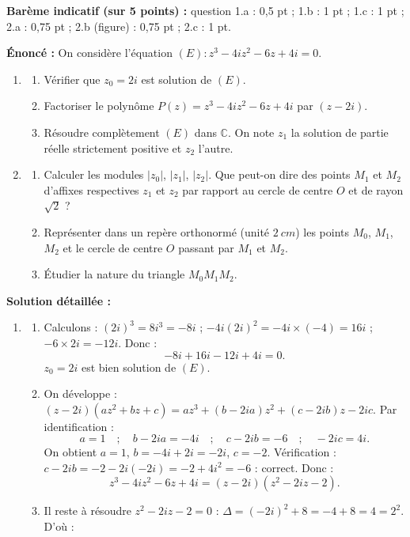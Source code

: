 \documentclass[11pt]{article}
\begin{document}
\begin{corrige}
\textbf{Barème indicatif (sur 5 points) :} question 1.a : 0,5 pt ; 1.b : 1 pt ; 1.c : 1 pt ; 2.a : 0,75 pt ; 2.b (figure) : 0,75 pt ; 2.c : 1 pt.

\textbf{Énoncé :} On considère l'équation $(E) : z^3 - 4iz^2 - 6z + 4i = 0$.
\begin{enumerate}
\item \begin{enumerate}
\item Vérifier que $z_0 = 2i$ est solution de $(E)$.
\item Factoriser le polynôme $P(z) = z^3 - 4iz^2 - 6z + 4i$ par $(z-2i)$.
\item Résoudre complètement $(E)$ dans $\mathbb{C}$. On note $z_1$ la solution de partie réelle strictement positive et $z_2$ l'autre.
\end{enumerate}
\item \begin{enumerate}
\item Calculer les modules $|z_0|$, $|z_1|$, $|z_2|$. Que peut-on dire des points $M_1$ et $M_2$ d'affixes respectives $z_1$ et $z_2$ par rapport au cercle de centre $O$ et de rayon $\sqrt{2}$ ?
\item Représenter dans un repère orthonormé (unité $\SI{2}{cm}$) les points $M_0$, $M_1$, $M_2$ et le cercle de centre $O$ passant par $M_1$ et $M_2$.
\item Étudier la nature du triangle $M_0M_1M_2$.
\end{enumerate}
\end{enumerate}
\tcblower
\textbf{Solution détaillée :}
\begin{enumerate}
\item 
\begin{enumerate}
\item Calculons : $(2i)^3 = 8i^3 = -8i$ ; $-4i(2i)^2 = -4i \times (-4) = 16i$ ; $-6 \times 2i = -12i$. Donc :
\[ -8i + 16i - 12i + 4i = 0. \]
$z_0 = 2i$ est bien solution de $(E)$.
\item On développe : $(z-2i)(az^2+bz+c) = az^3 + (b-2ia)z^2 + (c-2ib)z - 2ic$. Par identification :
\[ a = 1 \quad ; \quad b - 2ia = -4i \quad ; \quad c - 2ib = -6 \quad ; \quad -2ic = 4i. \]
On obtient $a = 1$, $b = -4i + 2i = -2i$, $c = -2$. Vérification : $c - 2ib = -2 - 2i(-2i) = -2 + 4i^2 = -6$ : correct. Donc :
\[ z^3 - 4iz^2 - 6z + 4i = (z - 2i)(z^2 - 2iz - 2). \]
\item Il reste à résoudre $z^2 - 2iz - 2 = 0$ : $\Delta = (-2i)^2 + 8 = -4 + 8 = 4 = 2^2$. D'où :

\end{enumerate}
\end{enumerate}
\end{corrige}
\end{document}
